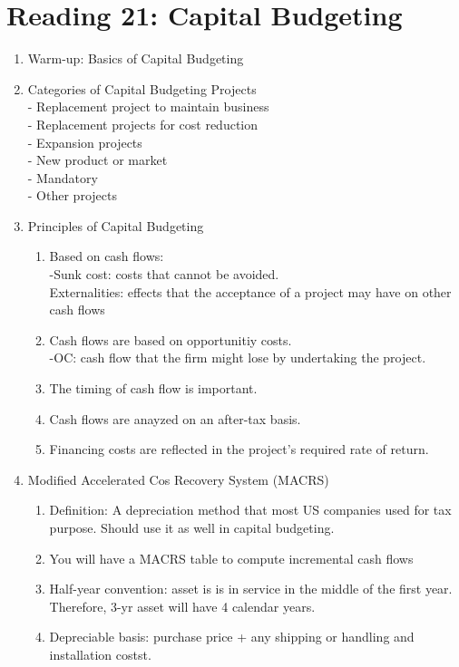 \documentclass{article}
\newcommand{\be}{\begin{enumerate}}
\newcommand{\ee}{\end{enumerate}}
\begin{document}
\section{Reading 21: Capital Budgeting}
\be
    \item Warm-up: Basics of Capital Budgeting
    \item Categories of Capital Budgeting Projects
        \\- Replacement project to maintain business
        \\- Replacement projects for cost reduction
        \\- Expansion projects
        \\- New product or market
        \\- Mandatory
        \\- Other projects
    \item Principles of Capital Budgeting
        \be
            \item Based on cash flows: 
                \\-Sunk cost: costs that cannot be avoided.
                \\Externalities: effects that the acceptance of a project
                may have on other cash flows
            \item Cash flows are based on opportunitiy costs.
                \\-OC: cash flow that the firm might lose by undertaking
                the project.
            \item The timing of cash flow is important.
            \item Cash flows are anayzed on an after-tax basis.
            \item Financing costs are reflected in the project's required rate 
                of return.
        \ee
    \item Modified Accelerated Cos Recovery System (MACRS)
        \be
            \item Definition: A depreciation method that most US companies used
                for tax purpose. Should use it as well in capital budgeting.
            \item You will have a MACRS table to compute incremental cash flows
            \item Half-year convention: asset is is in service in the middle of the
                first year. Therefore, 3-yr asset will have 4 calendar years.
            \item Depreciable basis: purchase price + any shipping or handling and
                installation costst.
        \ee
\ee
\end{document}
